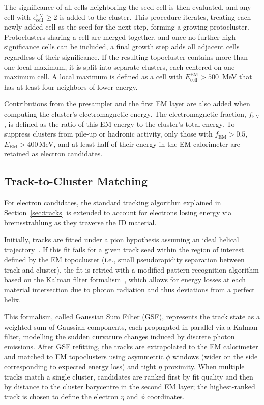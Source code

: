 The significance of all cells neighboring the seed cell is then evaluated, and any cell with $\epsilon_{\text{cell}}^{\text{EM}} \geq 2$ is added to the cluster. This procedure iterates, treating each newly added cell as the seed for the next step, forming a growing protocluster. Protoclusters sharing a cell are merged together, and once no further high-significance cells can be included, a final growth step adds all adjacent cells regardless of their significance. If the resulting topocluster contains more than one local maximum, it is split into separate clusters, each centered on one maximum cell. A local maximum is defined as a cell with \(E_{\text{cell}}^{\text{EM}}>500\)~MeV that has at least four neighbors of lower energy.

Contributions from the presampler and the first EM layer are also added when computing the cluster’s electromagnetic energy. The electromagnetic fraction, \(f_{\text{EM}}\), is defined as the ratio of this EM energy to the cluster’s total energy. To suppress clusters from pile-up or hadronic activity, only those with \(f_{\text{EM}}>0.5\), \(E_{\text{EM}}>400\)\,MeV, and at least half of their energy in the EM calorimeter are retained as electron candidates.  

\subsection{Track-to-Cluster Matching}

For electron candidates, the standard tracking algorithm explained in Section~\ref{sec:tracks} is extended to account for electrons losing energy via bremsstrahlung as they traverse the ID material. 

Initially, tracks are fitted under a pion hypothesis assuming an ideal helical trajectory~\cite{tracks}. If this fit fails for a given track seed within the region of interest defined by the EM topocluster (i.e., small pseudorapidity separation between track and cluster), the fit is retried with a modified pattern-recognition algorithm based on the Kalman filter formalism~\cite{FRUHWIRTH1987444}, which allows for energy losses at each material intersection due to photon radiation and thus deviations from a perfect helix.

This formalism, called Gaussian Sum Filter (GSF), represents the track state as a weighted sum of Gaussian components, each propagated in parallel via a Kalman filter, modelling the sudden curvature changes induced by discrete photon emissions. After GSF refitting, the tracks are extrapolated to the EM calorimeter and matched to EM topoclusters using asymmetric $\phi$ windows (wider on the side corresponding to expected energy loss) and tight $\eta$ proximity. When multiple tracks match a single cluster, candidates are ranked first by fit quality and then by distance to the cluster barycentre in the second EM layer; the highest-ranked track is chosen to define the electron $\eta$ and $\phi$ coordinates.


